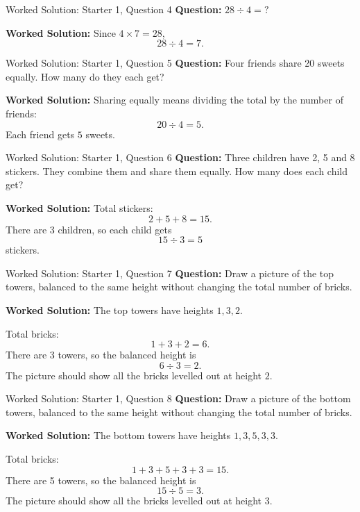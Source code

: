 \documentclass{beamer}
\begin{document}
\begin{frame}{Worked Solution: Starter 1, Question 4}
\textbf{Question:} \(28 \div 4 = ?\)

\textbf{Worked Solution:}
Since \(4 \times 7 = 28\),
\[
28 \div 4 = 7.
\]
\end{frame}

\begin{frame}{Worked Solution: Starter 1, Question 5}
\textbf{Question:} Four friends share 20 sweets equally. How many do they each get?

\textbf{Worked Solution:}
Sharing equally means dividing the total by the number of friends:
\[
20 \div 4 = 5.
\]
Each friend gets \(5\) sweets.
\end{frame}

\begin{frame}{Worked Solution: Starter 1, Question 6}
\textbf{Question:} Three children have 2, 5 and 8 stickers. They combine them and share them equally. How many does each child get?

\textbf{Worked Solution:}
Total stickers:
\[
2 + 5 + 8 = 15.
\]
There are 3 children, so each child gets
\[
15 \div 3 = 5
\]
stickers.
\end{frame}

\begin{frame}{Worked Solution: Starter 1, Question 7}
\textbf{Question:} Draw a picture of the top towers, balanced to the same height without changing the total number of bricks.

\textbf{Worked Solution:}
The top towers have heights \(1, 3, 2\).

Total bricks:
\[
1 + 3 + 2 = 6.
\]
There are 3 towers, so the balanced height is
\[
6 \div 3 = 2.
\]
The picture should show all the bricks levelled out at height \(2\).
\end{frame}

\begin{frame}{Worked Solution: Starter 1, Question 8}
\textbf{Question:} Draw a picture of the bottom towers, balanced to the same height without changing the total number of bricks.

\textbf{Worked Solution:}
The bottom towers have heights \(1, 3, 5, 3, 3\).

Total bricks:
\[
1 + 3 + 5 + 3 + 3 = 15.
\]
There are 5 towers, so the balanced height is
\[
15 \div 5 = 3.
\]
The picture should show all the bricks levelled out at height \(3\).
\end{frame}
\end{document}
